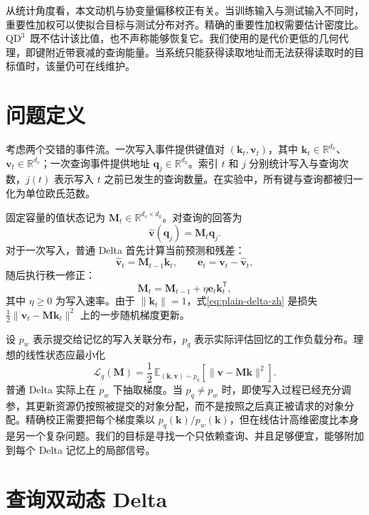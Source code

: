 \documentclass[11pt,a4paper]{ctexart}
\newcommand{\R}{\mathbb{R}}
\newcommand{\M}{\bm{M}}
\newcommand{\kvec}{\bm{k}}
\newcommand{\qvec}{\bm{q}}
\newcommand{\vvec}{\bm{v}}
\newcommand{\evec}{\bm{e}}
\newcommand{\norm}[1]{\lVert#1\rVert}
\newcommand{\QDDD}{\ensuremath{\mathrm{QD}^{3}}}
\begin{document}
从统计角度看，本文动机与协变量偏移校正有关。当训练输入与测试输入不同时，重要性加权可以使拟合目标与测试分布对齐\cite{sugiyama2007}。精确的重要性加权需要估计密度比。\QDDD\ 既不估计该比值，也不声称能够恢复它。我们使用的是代价更低的几何代理，即键附近带衰减的查询能量。当系统只能获得读取地址而无法获得读取时的目标值时，该量仍可在线维护。

\section{问题定义}\label{sec:problem-zh}

考虑两个交错的事件流。一次写入事件提供键值对 $(\kvec_t,\vvec_t)$，其中 $\kvec_t\in\R^{d_k}$、$\vvec_t\in\R^{d_v}$；一次查询事件提供地址 $\qvec_j\in\R^{d_k}$。索引 $t$ 和 $j$ 分别统计写入与查询次数，$j(t)$ 表示写入 $t$ 之前已发生的查询数量。在实验中，所有键与查询都被归一化为单位欧氏范数。

固定容量的值状态记为 $\M_t\in\R^{d_v\times d_k}$。对查询的回答为
\begin{equation}
 \widehat{\vvec}(\qvec_j)=\M_t\qvec_j.
 \label{eq:read-zh}
\end{equation}
对于一次写入，普通 Delta 首先计算当前预测和残差：
\begin{equation}
 \widehat{\vvec}_t=\M_{t-1}\kvec_t,
 \qquad
 \evec_t=\vvec_t-\widehat{\vvec}_t,
 \label{eq:residual-zh}
\end{equation}
随后执行秩一修正：
\begin{equation}
 \M_t=\M_{t-1}+\eta\evec_t\kvec_t^{\mathsf T},
 \label{eq:plain-delta-zh}
\end{equation}
其中 $\eta\geq0$ 为写入速率。由于 $\norm{\kvec_t}=1$，式\eqref{eq:plain-delta-zh} 是损失 $\tfrac12\norm{\vvec_t-\M\kvec_t}^2$ 上的一步随机梯度更新。

设 $p_w$ 表示提交给记忆的写入关联分布，$p_q$ 表示实际评估回忆的工作负载分布。理想的线性状态应最小化
\begin{equation}
 \mathcal{L}_q(\M)=\frac12\,\mathbb{E}_{(\kvec,\vvec)\sim p_q}
 \left[\norm{\vvec-\M\kvec}^{2}\right].
 \label{eq:query-risk-zh}
\end{equation}
普通 Delta 实际上在 $p_w$ 下抽取梯度。当 $p_q\neq p_w$ 时，即使写入过程已经充分调参，其更新资源仍按照被提交的对象分配，而不是按照之后真正被请求的对象分配。精确校正需要把每个梯度乘以 $p_q(\kvec)/p_w(\kvec)$，但在线估计高维密度比本身是另一个复杂问题。我们的目标是寻找一个只依赖查询、并且足够便宜，能够附加到每个 Delta 记忆上的局部信号。

\section{查询双动态 Delta}\label{sec:method-zh}
\end{document}
